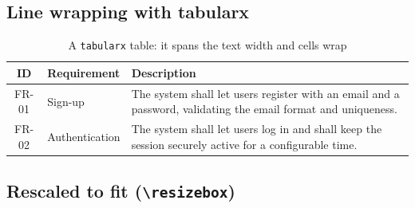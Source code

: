 \subsection{Line wrapping with tabularx}

\begin{table}[H]
  \centering
  \begin{tabularx}{\textwidth}{|c|l|X|}
    \hline
    \textbf{ID} & \textbf{Requirement} & \textbf{Description} \\ \hline
    FR-01 & Sign-up & The system shall let users register with an email and a password, validating the email format and uniqueness. \\ \hline
    FR-02 & Authentication & The system shall let users log in and shall keep the session securely active for a configurable time. \\ \hline
  \end{tabularx}
  \caption{A \texttt{tabularx} table: it spans the text width and cells wrap}
  \label{tab:tabularx}
\end{table}

\subsection{Rescaled to fit (\texttt{\textbackslash resizebox})}

\begin{table}[H]
  \centering
  \caption{A table rescaled with \texttt{\textbackslash resizebox} to fit the text width}
  \label{tab:resizebox}
\end{table}

